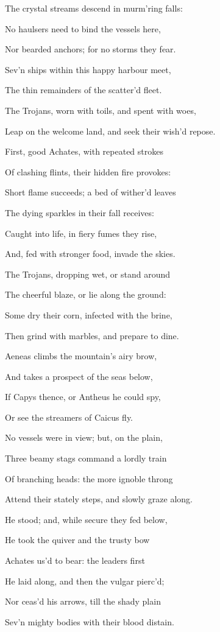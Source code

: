 The crystal streams descend in murm’ring falls:

No haulsers need to bind the vessels here,

Nor bearded anchors; for no storms they fear.

Sev’n ships within this happy harbour meet,

The thin remainders of the scatter’d fleet.

The Trojans, worn with toils, and spent with woes,

Leap on the welcome land, and seek their wish’d repose.

First, good Achates, with repeated strokes

Of clashing flints, their hidden fire provokes:

Short flame succeeds; a bed of wither’d leaves

The dying sparkles in their fall receives:

Caught into life, in fiery fumes they rise,

And, fed with stronger food, invade the skies.

The Trojans, dropping wet, or stand around

The cheerful blaze, or lie along the ground:

Some dry their corn, infected with the brine,

Then grind with marbles, and prepare to dine.

Aeneas climbs the mountain’s airy brow,

And takes a prospect of the seas below,

If Capys thence, or Antheus he could spy,

Or see the streamers of Caicus fly.

No vessels were in view; but, on the plain,

Three beamy stags command a lordly train

Of branching heads: the more ignoble throng

Attend their stately steps, and slowly graze along.

He stood; and, while secure they fed below,

He took the quiver and the trusty bow

Achates us’d to bear: the leaders first

He laid along, and then the vulgar pierc’d;

Nor ceas’d his arrows, till the shady plain

Sev’n mighty bodies with their blood distain.


